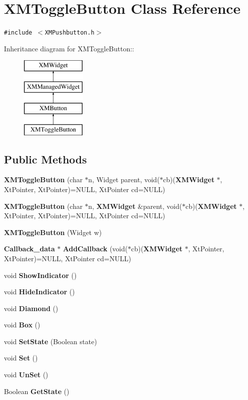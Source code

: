 \section{XMToggle\-Button  Class Reference}
\label{classXMToggleButton}
{\tt \#include $<$XMPushbutton.h$>$}

Inheritance diagram for XMToggle\-Button::\begin{figure}[H]
\begin{center}
\leavevmode
\includegraphics[height=4cm]{classXMToggleButton}
\end{center}
\end{figure}
\subsection*{Public Methods}
\begin{CompactItemize}
\item 
{\bf XMToggle\-Button} (char $\ast$n, Widget parent, void($\ast$cb)({\bf XMWidget} $\ast$, Xt\-Pointer, Xt\-Pointer)=NULL, Xt\-Pointer cd=NULL)
\item 
{\bf XMToggle\-Button} (char $\ast$n, {\bf XMWidget} \&parent, void($\ast$cb)({\bf XMWidget} $\ast$, Xt\-Pointer, Xt\-Pointer)=NULL, Xt\-Pointer cd=NULL)
\item 
{\bf XMToggle\-Button} (Widget w)
\item 
{\bf Callback\_\-data} $\ast$ {\bf Add\-Callback} (void($\ast$cb)({\bf XMWidget} $\ast$, Xt\-Pointer, Xt\-Pointer)=NULL, Xt\-Pointer cd=NULL)
\item 
void {\bf Show\-Indicator} ()
\item 
void {\bf Hide\-Indicator} ()
\item 
void {\bf Diamond} ()
\item 
void {\bf Box} ()
\item 
void {\bf Set\-State} (Boolean state)
\item 
void {\bf Set} ()
\item 
void {\bf Un\-Set} ()
\item 
Boolean {\bf Get\-State} ()
\end{CompactItemize}


